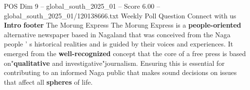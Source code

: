 \begin{textsample}{POS Dim 9 – global\_south\_2025\_01 – Score 6.00 – global\_south\_2025\_01/120138666.txt}
Weekly Poll Question Connect with us \textbf{Intro} \textbf{footer} The Morung Express The Morung Express is a \textbf{people-oriented} alternative newspaper based in Nagaland that was conceived from the Naga people ' s historical realities and is guided by their voices and experiences.
It emerged from the \textbf{well-recognized} concept that the core of a free press is based on"\textbf{qualitative} and investigative"journalism.
Ensuring this is essential for contributing to an informed Naga public that makes sound decisions on issues that affect all \textbf{spheres} of life.

\end{textsample}
